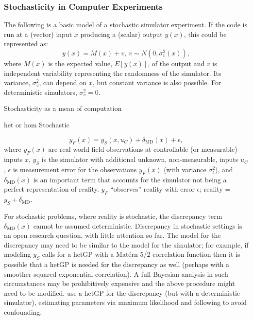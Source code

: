 \documentclass[nopagenumber,9pt]{beamer}
\begin{document}
\begin{frame}
 \frametitle{Stochasticity in Computer Experiments}
 
 
 The following is a basic model of a stochastic simulator experiment. If the code is run at a (vector) input $x$ producing a (scalar) output $y(x)$, this could be represented as:
\begin{equation}
y(x) = M(x) + v, \ v \sim N(0, \sigma_v^2(x)),
\label{eq:basic}
\end{equation}
where $M(x)$ is the expected value, $E[y(x)]$, of the output and $v$ is independent variability representing the randomness of the simulator. Its variance, $\sigma^2_v$, can depend on $x$, but constant variance is also possible. For deterministic simulators, $\sigma^2_v = 0$.


 Stochasticity as a mean of computation
 
 het or hom Stochastic
 
\end{frame}


\begin{frame}
 
\begin{equation}
y_F(x)  = y_S(x,u_C) + \delta_{\mathrm{MD}}(x)  + \epsilon,
\label{eq:obsmodel}
\end{equation} 
where $y_F(x)$ are real-world field observations at controllable (or measurable) inputs $x$, $y_S$ is the simulator with additional unknown, non-measurable, inputs $u_C$, $\epsilon$ is measurement error for the observations $y_F(x)$ (with variance $\sigma_{\epsilon}^2$), and $\delta_{\mathrm{MD}}(x)$ is an important term that accounts for the simulator not being a perfect representation of reality. $y_F$ ``observes'' reality with error $\epsilon$;  reality = $y_S+\delta_{\mathrm{MD}}$. 
 
 
 For stochastic problems, where reality is stochastic, the discrepancy term $\delta_{\mathrm{MD}}(x)$ cannot be assumed deterministic. Discrepancy in stochastic settings is an open research question, with little attention so far. The model for the discrepancy may need to be similar to the model for the simulator; for example, if modeling $y_S$ calls for a hetGP with a Mat\'ern 5/2 correlation function then it is possible that a hetGP is needed for the discrepancy as well (perhaps with a smoother squared exponential correlation). A full Bayesian analysis in such circumstances may be prohibitively expensive and the above procedure might need to be modified. 
\cite{sung2019calibration} use a hetGP for the discrepancy (but with a deterministic simulator), estimating parameters via maximum likelihood and following \cite{tuo2015efficient} to avoid confounding.

\end{frame}
\end{document}
